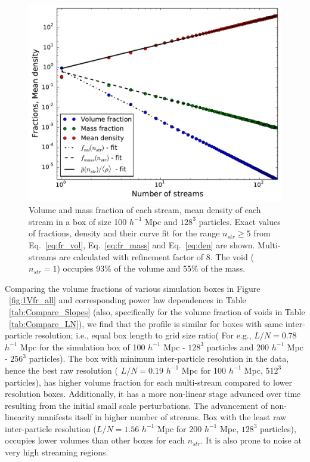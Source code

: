 \begin{figure}
\begin{minipage}[t]{.99\linewidth}
  \centering\includegraphics[width=10.cm]{Chapter3/Source_v2/fig2} 
\end{minipage}\hfill
\caption{Volume and mass fraction of each stream, mean density of each stream in a box of size 100 $h^{-1}$ Mpc and  $128^3$ particles. Exact values of fractions, density and their curve fit for the range $n_{str} \ge 5 $ from Eq.~\ref{eq:fr_vol}, Eq.~\ref{eq:fr_mass} and Eq.~\ref{eq:den} are shown. Multi-streams are calculated with refinement factor of 8. The void ($n_{str} = 1$) occupies 93$\%$ of the volume and 55$\%$ of the mass. }
\label{fig:1m_v_fr}
\end{figure}

Comparing the volume fractions of various simulation boxes in Figure ~\ref{fig:1Vfr_all} and corresponding power law dependences in Table ~\ref{tab:Compare_Slopes} (also, specifically for the volume fraction of voids in Table ~\ref{tab:Compare_LN}), we find that the profile is similar for boxes with
same inter-particle resolution; i.e., equal box length to grid size ratio( For e.g., $L/N = 0.78$ $h^{-1}$ Mpc for the simulation box of 100 $h^{-1}$ Mpc - $128^3$ particles and 200 $h^{-1}$ Mpc - $256^{3}$ particles). The box with minimum inter-particle resolution in the data, hence the best raw resolution ( $L/N = 0.19$ $h^{-1}$ Mpc for 100 $h^{-1}$ Mpc, $512^3$ particles), has higher volume fraction for each multi-stream compared to lower resolution boxes. Additionally, it has a more non-linear stage advanced over time resulting from the initial small scale perturbations. The advancement of  non-linearity manifests itself in higher number of streams. Box with the least raw inter-particle resolution ($L/N = 1.56 $  $h^{-1}$ Mpc for 200 $h^{-1}$ Mpc, $128^3$ particles), occupies lower volumes than other boxes for each $n_{str}$. It is also prone to noise at very high streaming regions.

